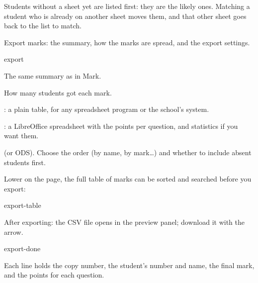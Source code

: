 \documentclass[11pt]{article}
\begin{document}
\begin{tip}
Students without a sheet yet are listed first: they are the likely ones. Matching a student who is already on another sheet moves them, and that other sheet goes back to the list to match.
\end{tip}

\label{step:export}

\begin{keep}
\begin{guidefig}{Export marks: the summary, how the marks are spread, and the export settings.}
\begin{shot}{export}
\end{shot}
\end{guidefig}
\begin{callouts}
  \item The same summary as in Mark.
  \item How many students got each mark.
  \item {}: a plain table, for any spreadsheet program or the school's system.
  \item {}: a LibreOffice spreadsheet with the points per question, and statistics if you want them.
  \item {} (or ODS). Choose the order (by name, by mark\ldots) and whether to include absent students first.
\end{callouts}
\end{keep}

Lower on the page, the full table of marks can be sorted and searched before you export:

\begin{center}
\begin{shot}[0.7\linewidth]{export-table}
\end{shot}
\end{center}

\begin{guidefig}{After exporting: the CSV file opens in the preview panel; download it with the arrow.}
\begin{shot}{export-done}
\end{shot}
\end{guidefig}

Each line holds the copy number, the student's number and name, the final mark, and the points for each question.
\end{document}
